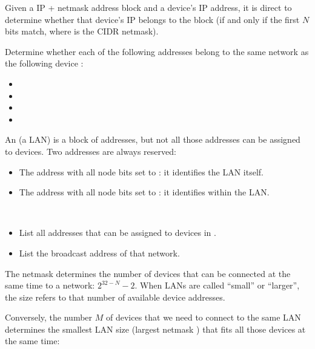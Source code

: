 Given a IP + netmask address block and a device's IP address, it is direct to determine 
whether that device's IP belongs to the block (if and only if the first $N$ bits match,
where  is the CIDR netmask).

\begin{exercise}
Determine whether each of the following addresses belong to the same network as
the following device :
\begin{itemize}
\item {}
\item {}
\item {}
\item {}
\end{itemize}
\end{exercise}

An  (a LAN) is a block of addresses, but not all those addresses 
can be assigned to devices. Two addresses are always reserved:
\begin{itemize}
\item The address with all node bits set to : it identifies the LAN itself.
\item The address with all node bits set to : it identifies  within the LAN.
\end{itemize}

\begin{exercise}\ \\[-0.5cm]
\begin{itemize}
\item List all addresses that can be assigned to devices in .
\item List the broadcast address of that network.
\end{itemize}
\end{exercise}

The netmask  determines the number of devices that can be connected at the same time
to a network: $2^{32-N} - 2$. When LANs are called ``small'' or ``larger'', the size refers to that 
number of available device addresses. 

Conversely, the number $M$ of devices that we need to connect to the same LAN determines the 
smallest LAN size (largest netmask ) that fits all those devices at the same time:

